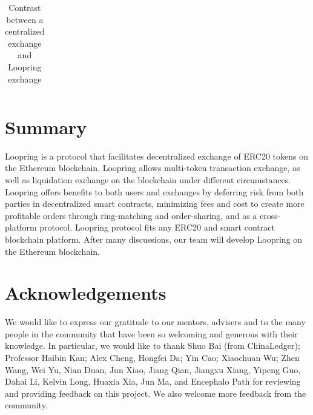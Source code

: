 \documentclass[UTF8,nofonts]{article}
\begin{document}
\begin{table}[hbt]
\begin{tabular}{p{5cm}|p{2.5cm}|p{2.5cm}}
  \end{tabular}

\caption{Contrast between a centralized exchange and Loopring exchange} %
\end{table}



\section{Summary\label{sec: summary}}

Loopring is a protocol that facilitates decentralized exchange of ERC20 tokens on the Ethereum blockchain. Loopring allows multi-token transaction exchange, as well as liquidation exchange on the blockchain under different circumstances. Loopring offers benefits to both users and exchanges by deferring risk from both parties in decentralized smart contracts, minimizing fees and cost to create more profitable orders through ring-matching and order-sharing, and as a cross-platform protocol. Loopring protocol fits any ERC20 and smart contract blockchain platform. After many discussions,  our team will develop Loopring on the Ethereum blockchain.

\section{Acknowledgements\label{sec: acknowledgement}}

We would like to express our gratitude to our mentors, advisers and to the many people in the community that have been so welcoming and generous with their knowledge. In particular, we would like to thank Shuo Bai (from ChinaLedger); Professor Haibin Kan; Alex Cheng, Hongfei Da; Yin Cao; Xiaochuan Wu; Zhen Wang, Wei Yu, Nian Duan, Jun Xiao, Jiang Qian, Jiangxu Xiang, Yipeng Guo, Dahai Li, Kelvin Long, Huaxia Xia, Jun Ma, and Encephalo Path for reviewing and providing feedback on this project. We also welcome more feedback from the community.

\newpage  


\end{document}

